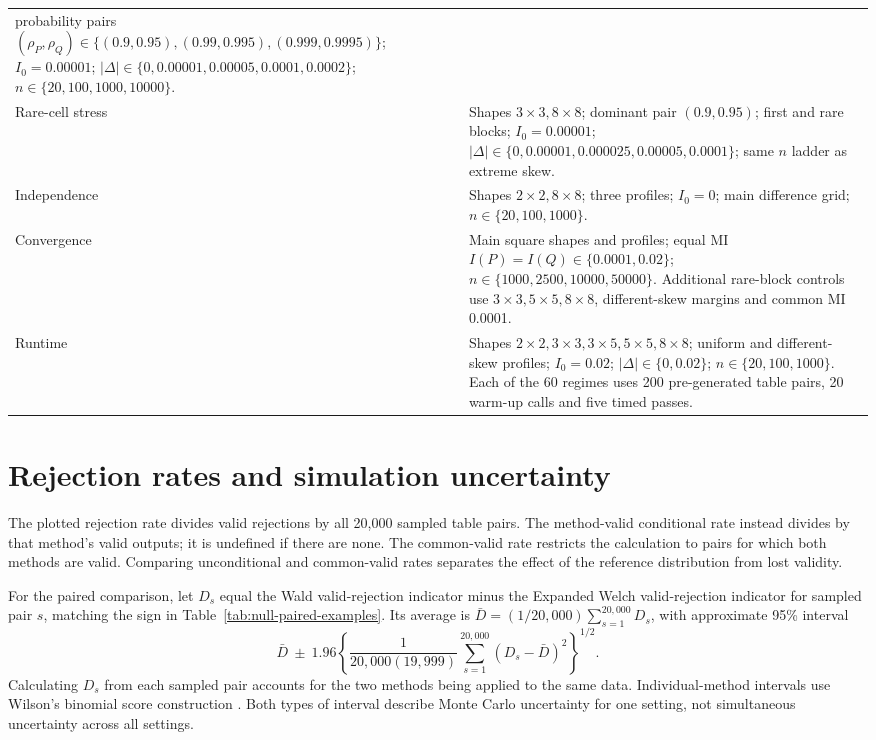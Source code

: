 \begin{longtable}{@{}p{}p{}@{}}
probability pairs \((\rho_P,\rho_Q)\in\{(0.9,0.95),(0.99,0.995),
(0.999,0.9995)\}\); \(I_0=0.00001\);
\(|\Delta|\in\{0,0.00001,0.00005,0.0001,0.0002\}\);
\(n\in\{20,100,1000,10000\}\).\\
Rare-cell stress & Shapes \(3\times3,8\times8\); dominant pair
\((0.9,0.95)\); first and rare blocks; \(I_0=0.00001\);
\(|\Delta|\in\{0,0.00001,0.000025,0.00005,0.0001\}\);
same \(n\) ladder as extreme skew.\\
Independence & Shapes \(2\times2,8\times8\); three profiles;
\(I_0=0\); main difference grid;
\(n\in\{20,100,1000\}\).\\
Convergence & Main square shapes and profiles; equal MI
\(I(P)=I(Q)\in\{0.0001,0.02\}\);
\(n\in\{1000,2500,10000,50000\}\). Additional rare-block controls
use \(3\times3,5\times5,8\times8\), different-skew margins and common
MI 0.0001.\\
Runtime & Shapes \(2\times2,3\times3,3\times5,5\times5,8\times8\);
uniform and different-skew profiles; \(I_0=0.02\);
\(|\Delta|\in\{0,0.02\}\); \(n\in\{20,100,1000\}\).
Each of the 60 regimes uses 200 pre-generated table pairs, 20 warm-up calls
and five timed passes.\\
\bottomrule
\end{longtable}

\section{Rejection rates and simulation uncertainty}
\label{sec:simulation-uncertainty}

The plotted rejection rate divides valid rejections by all 20,000 sampled
table pairs. The method-valid conditional rate instead divides by that
method's valid outputs; it is undefined if there are none. The common-valid
rate restricts the calculation to pairs for which both methods are valid.
Comparing unconditional and common-valid rates separates the effect of the
reference distribution from lost validity.

For the paired comparison, let \(D_s\) equal the Wald valid-rejection
indicator minus the Expanded Welch valid-rejection indicator for sampled
pair \(s\), matching the sign in Table~\ref{tab:null-paired-examples}.
Its average is \(\bar D=(1/20{,}000)\sum_{s=1}^{20{,}000}D_s\), with
approximate 95\% interval
\begin{equation}
 \bar D\ \pm\ 1.96
 \left\{\frac{1}{20{,}000(19{,}999)}
 \sum_{s=1}^{20{,}000}(D_s-\bar D)^2\right\}^{1/2}.
\end{equation}
Calculating \(D_s\) from each sampled pair accounts for the two methods
being applied to the same data. Individual-method
intervals use Wilson's binomial score construction \citep{wilson1927}.
Both types of interval describe Monte Carlo uncertainty for one setting,
not simultaneous uncertainty across all settings.

